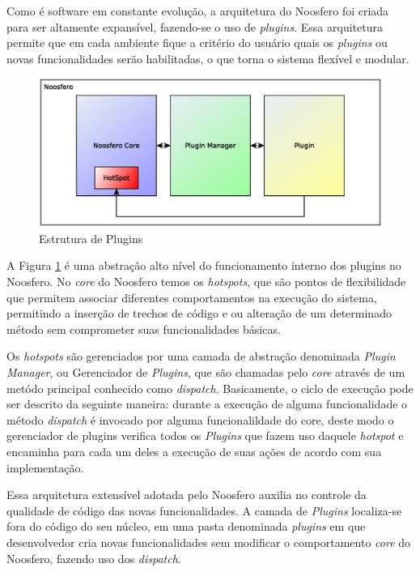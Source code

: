 Como é software em constante evolução, a arquitetura do Noosfero foi criada para ser altamente expansível, fazendo-se o uso de \textit{plugins}. Essa arquitetura permite que em cada ambiente fique a critério do usuário quais os \textit{plugins} ou novas funcionalidades serão habilitadas, o que torna o sistema flexível e modular.

\begin{figure}[h]
    \centering
    \includegraphics[keepaspectratio=true,scale=0.7]
      {figuras/estruturaDePlugins.eps}
    \caption{Estrutura de Plugins}
    \label{estrutura-plugins}
\end{figure}

A Figura \ref{estrutura-plugins} é uma abstração alto nível do funcionamento interno dos plugins no Noosfero. No \textit{core} do Noosfero temos os \textit{hotspots}, que são pontos de flexibilidade que permitem associar diferentes comportamentos na execução do sistema, permitindo a inserção de trechos de código e ou alteração de um determinado método sem comprometer suas funcionalidades básicas.

Os \textit{hotspots} são gerenciados por uma camada de abstração denominada \textit{Plugin Manager}, ou Gerenciador de \textit{Plugins}, que são chamadas pelo \textit{core} através de um metódo principal conhecido como \textit{dispatch}. Basicamente, o ciclo de execução pode ser descrito da seguinte maneira: durante a execução de alguma funcionalidade o método \textit{dispatch} é invocado por alguma funcionalildade do core, deste modo o gerenciador de plugins verifica todos os \textit{Plugins} que fazem uso daquele \textit{hotspot} e encaminha para cada um deles a execução de suas ações de acordo com sua implementação.

Essa arquitetura extensível adotada pelo Noosfero auxilia no controle da qualidade de código das novas funcionalidades. A camada de \textit{Plugins} localiza-se fora do código do seu núcleo, em uma pasta denominada \textit{plugins} em que desenvolvedor cria novas funcionalidades sem modificar o comportamento \textit{core} do Noosfero, fazendo uso dos \textit{dispatch}.

